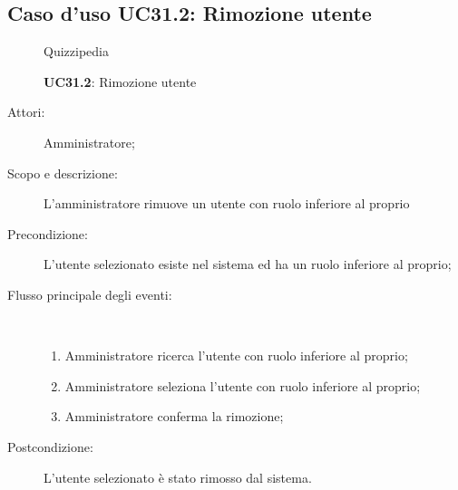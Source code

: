 \subsection{Caso d'uso UC31.2: Rimozione utente}
	\begin{figure}[H]
		\centering
		\begin{resizedtikzpicture}{\textwidth}
		\begin{umlsystem}[x=0, fill=lightgray!20]{Quizzipedia}
		\end{umlsystem}
		\end{resizedtikzpicture}
		\caption{\textbf{UC31.2}: Rimozione utente}
		\label{UC31.2}
	\end{figure}
\begin{description}
\item[Attori:] Amministratore;
\item[Scopo e descrizione:] L'amministratore rimuove un utente con ruolo inferiore al proprio
      \item[Precondizione:] L'utente selezionato esiste nel sistema ed ha un ruolo inferiore al proprio;

        \item[Flusso principale degli eventi:] \ 
 \begin{enumerate}
          \item Amministratore ricerca l'utente con ruolo inferiore al proprio;
          \item Amministratore seleziona l'utente con ruolo inferiore al proprio;
          \item Amministratore conferma la rimozione;

      \end{enumerate}
    \item[Postcondizione:] L'utente selezionato è stato rimosso dal sistema.
  \end{description}
\hypertarget{UC32}{}
